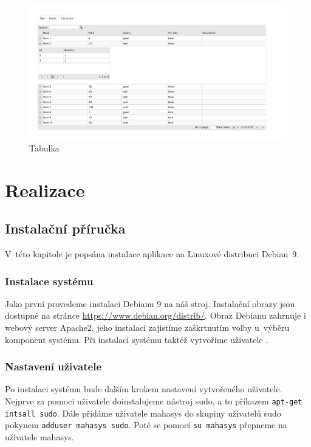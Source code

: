 \documentclass[thesis=B,czech]{FITthesis}[2012/06/26]
\begin{document}
\begin{figure}
	\includegraphics[width=500pt, height=\textwidth, angle=90]{data_table.pdf}
	\caption{Tabulka}\label{tabulka}
\end{figure}
	

\chapter{Realizace}

\section{Instalační příručka}
	V~této kapitole je popsána instalace aplikace na Linuxové distribuci Debian~9.
\subsection{Instalace systému}
	Jako první provedeme instalaci Debianu 9 na náš stroj. Instalační obrazy jsou dostupné na stránce \url{https://www.debian.org/distrib/}. Obraz Debianu zahrnuje i webový server Apache2, jeho instalaci zajistíme zaškrtnutím volby  u~výběru komponent systému. Při instalaci systému taktéž vytvoříme uživatele .
\subsection{Nastavení uživatele}
	Po instalaci systému bude dalším krokem nastavení vytvořeného uživatele. Nejprve za pomoci uživatele  doinstalujeme nástroj sudo, a to příkazem \verb|apt-get intsall sudo|. Dále přidáme uživatele mahasys do skupiny uživatelů sudo pokynem \verb|adduser mahasys sudo|. Poté se pomocí \verb|su mahasys| přepneme na uživatele mahasys.
\end{document}
